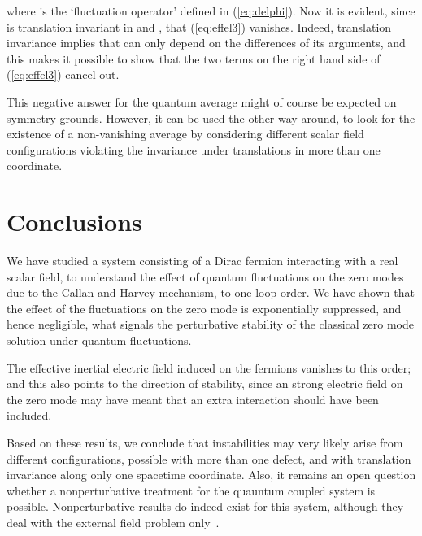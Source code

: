 \documentclass[a4paper,12pt]{article}
\begin{document}
where \myHighlight{$\Delta_\varphi$}\coordHE{} is the `fluctuation operator' defined in (\ref{eq:delphi}).
Now it is evident, since \myHighlight{$\Delta_\varphi$}\coordHE{} is translation invariant in \coordHE{} and
\coordHE{}, that (\ref{eq:effel3}) vanishes. Indeed, translation invariance
implies that \myHighlight{$\Delta_\varphi$}\coordHE{} can only depend on the differences of its
arguments, and this makes it possible to show that the two terms on
the right hand side of  (\ref{eq:effel3}) cancel out.

This negative answer for the quantum average might of course be
expected on symmetry grounds. However, it can be used the other way
around, to look for the existence of a non-vanishing average by
considering different scalar field configurations
violating the invariance under translations in more than one coordinate.



\section{Conclusions}\label{sec:conc}
%
We have studied a system consisting of a Dirac fermion interacting 
with a real scalar field, to understand the effect of quantum 
fluctuations on the zero modes due to the Callan and
Harvey mechanism, to one-loop order.
We have shown that the effect of the fluctuations on the zero mode
is exponentially suppressed, and hence negligible, what signals the
perturbative stability of the classical zero mode solution under 
quantum fluctuations.

The effective inertial electric field induced on the fermions vanishes
to this order; and this also points to the direction of stability, since
an strong electric field on the zero mode may have meant that an
extra interaction should have been included.

Based on these results, we conclude that instabilities may very
likely arise from different configurations, possible with more than
one defect, and with translation invariance along only one spacetime
coordinate. Also, it remains an open question whether a nonperturbative
treatment for the quauntum coupled system is possible.  Nonperturbative
results do indeed exist for this system, although they deal with the 
external field problem only~\cite{DaRold:2001ri}.
\end{document}
